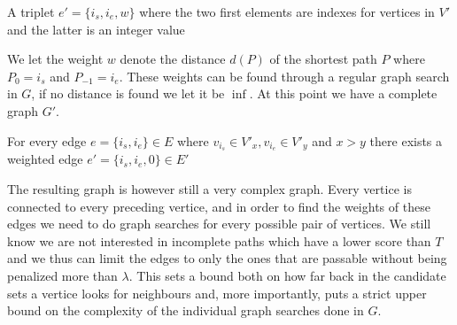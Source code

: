 \documentclass[thesis.tex]{subfiles}
\begin{document}
\begin{defn}
  A triplet $e'=\{i_s, i_e, w\}$ where the two first elements are indexes for vertices in $V'$ and the latter is an integer value
\end{defn}
We let the weight $w$ denote the distance $d(P)$ of the shortest path $P$ where $P_0=i_s$ and $P_{-1}=i_e$. These weights can be found through a regular graph search in $G$, if no distance is found we let it be $\inf$. At this point we have a complete graph $G'$.
\begin{corollary}
  For every edge $e=\{i_s, i_e\} \in E$ where $v_{i_s} \in V'_x, v_{i_e} \in V'_y$ and $x>y$ there exists a weighted edge $e'=\{i_s, i_e, 0\} \in E'$
\end{corollary}
The resulting graph is however still a very complex graph. Every vertice is connected to every preceding vertice, and in order to find the weights of these edges we need to do graph searches for every possible pair of vertices. We still know we are not interested in incomplete paths which have a lower score than $T$ and we thus can limit the edges to only the ones that are passable without being penalized more than $\lambda$. This sets a bound both on how far back in the candidate sets a vertice looks for neighbours and, more importantly, puts a strict upper bound on the complexity of the individual graph searches done in $G$.
\end{document}
